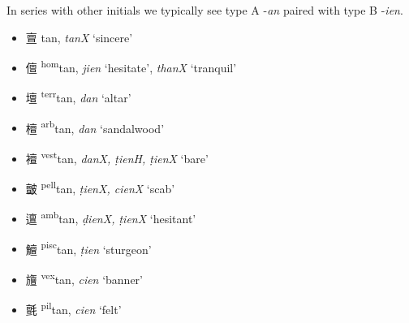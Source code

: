 In series with other initials we typically see type A -\textit{an} paired with type B -\textit{ien}. 
   
\begin{itemize}
  \item {\Large{亶}} %
    {\large{tan}},
    \textit{tanX} `sincere' %


  \item {\Large{儃}} %
    {\large{{\textsuperscript{hom}}tan}},
    \textit{jien} `hesitate', \textit{thanX} `tranquil' %

  \item {\Large{壇}} %
    {\large{{\textsuperscript{terr}}tan}},
    \textit{dan} `altar' %

  \item {\Large{檀}} %
    {\large{{\textsuperscript{arb}}tan}},
    \textit{dan} `sandalwood' %


  \item {\Large{襢}} %
    {\large{{\textsuperscript{vest}}tan}},
    \textit{danX, ṭienH, ṭienX} `bare' %

  \item {\Large{皽}} %
    {\large{{\textsuperscript{pell}}tan}},
    \textit{ṭienX, cienX} `scab' %

  \item {\Large{邅}} %
    {\large{{\textsuperscript{amb}}tan}},
    \textit{ḍienX, ṭienX} `hesitant' %

  \item {\Large{鱣}} %
    {\large{{\textsuperscript{pisc}}tan}},
    \textit{ṭien} `sturgeon' %

  \item {\Large{旜}} %
    {\large{{\textsuperscript{vex}}tan}},
    \textit{cien} `banner' %

  \item {\Large{氈}} %
    {\large{{\textsuperscript{pil}}tan}},
    \textit{cien} `felt' %


\end{itemize}
